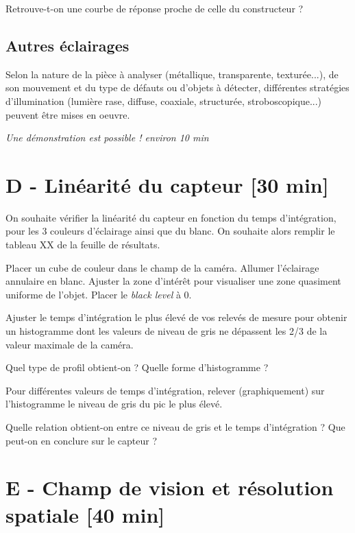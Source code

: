 \medskip

\Quest Retrouve-t-on une courbe de réponse proche de celle du constructeur ?

\vfill

\subsection{Autres éclairages}

Selon la nature de la pièce à analyser (métallique, transparente, texturée...), de son mouvement et du type de défauts ou d'objets à détecter, différentes stratégies d'illumination (lumière rase, diffuse, coaxiale, structurée, stroboscopique...) peuvent être mises en oeuvre. 

\textit{Une démonstration est possible ! environ 10 min}


\newpage
\section{D - Linéarité du capteur {[30 min]}}

On souhaite vérifier la linéarité du capteur en fonction du temps d'intégration, pour les 3 couleurs d'éclairage ainsi que du blanc. On souhaite alors remplir le tableau XX de la feuille de résultats.

\Manip Placer un cube de couleur dans le champ de la caméra. Allumer l'éclairage annulaire en blanc. Ajuster la zone d'intérêt pour visualiser une zone quasiment uniforme de l'objet. Placer le \textit{black level} à 0.

\Manip Ajuster le temps d'intégration le plus élevé de vos relevés de mesure pour obtenir un histogramme dont les valeurs de niveau de gris ne dépassent les  2/3 de la valeur maximale de la caméra. 

\Quest Quel type de profil obtient-on ? Quelle forme d'histogramme ?

\Manip Pour différentes valeurs de temps d'intégration, relever (graphiquement) sur l'histogramme le niveau de gris du pic le plus élevé.

\Quest Quelle relation obtient-on entre ce niveau de gris et le temps d'intégration ? Que peut-on en conclure sur le capteur ?



\section{E - Champ de vision et résolution spatiale {[40 min]}}

